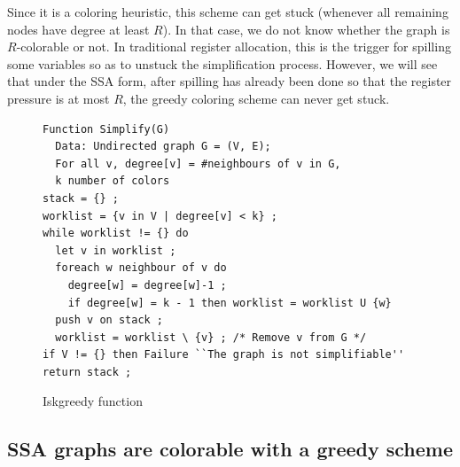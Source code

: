 {Since it is a coloring heuristic, this scheme can get stuck (whenever all remaining nodes have degree at least $R$).
In that case, we do not know whether the graph is $R$-colorable or not.
In traditional register allocation, this is the trigger for spilling some variables so as to unstuck the simplification process.
However, we will see that under the SSA form, after spilling has already been done so that the register pressure is at most $R$, the greedy coloring scheme can never get stuck.

\begin{figure}
\begin{verbatim}
Function Simplify(G)
  Data: Undirected graph G = (V, E);
  For all v, degree[v] = #neighbours of v in G,
  k number of colors
stack = {} ;
worklist = {v in V | degree[v] < k} ;
while worklist != {} do
  let v in worklist ;
  foreach w neighbour of v do
    degree[w] = degree[w]-1 ;
    if degree[w] = k - 1 then worklist = worklist U {w}
  push v on stack ;
  worklist = worklist \ {v} ; /* Remove v from G */
if V != {} then Failure ``The graph is not simplifiable''
return stack ;
\end{verbatim}
\caption{Iskgreedy function}
\label{code:is-k-greedy}
\end{figure}



\subsection{SSA graphs are colorable with a greedy scheme}
\label{sec:regalloc:ssa-greedy}

}
